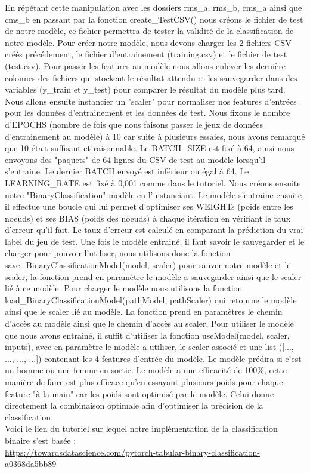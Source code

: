 \documentclass[a4paper,12pt]{report}	%
\begin{document}
En répétant cette manipulation avec les dossiers rms\_a, rms\_b, cms\_a ainsi que cms\_b en passant par la fonction create\_TestCSV() nous créons le fichier de test de notre modèle, ce fichier permettra de tester la validité de la classification de notre modèle. Pour créer notre modèle, nous devons charger les 2 fichiers CSV créés précédement, le fichier d'entrainement (training.csv) et le fichier de test (test.csv). Pour passer les features au modèle nous allons enlever les dernière colonnes des fichiers qui stockent le résultat attendu et les sauvegarder dans des variables (y\_train et y\_test) pour comparer le résultat du modèle plus tard.
Nous allons ensuite instancier un "scaler" pour normaliser nos features d'entrées pour les données d'entrainement et les données de test. Nous fixons le nombre d'EPOCHS (nombre de fois que nous faisons passer le jeux de données d'entrainement au modèle) à 10 car suite à plusieurs essaies, nous avons remarqué que 10 était suffisant et raisonnable. Le BATCH\_SIZE est fixé à 64, ainsi nous envoyons des "paquets" de 64 lignes du CSV de test au modèle lorsqu'il s'entraine. Le dernier BATCH envoyé est inférieur ou égal à 64.
Le LEARNING\_RATE est fixé à 0,001 comme dans le tutoriel. Nous créons ensuite notre "BinaryClassification" modèle en l'instanciant. Le modèle s'entraine ensuite, il effectue une boucle qui lui permet d'optimiser ses WEIGHTs (poids entre les noeuds) et ses BIAS (poids des noeuds) à chaque itération en vérifiant le taux d'erreur qu'il fait. Le taux d'erreur est calculé en comparant la prédiction du vrai label du jeu de test. Une fois le modèle entrainé, il faut savoir le sauvegarder et le charger pour pouvoir l'utiliser, nous utilisons donc la fonction save\_BinaryClassificationModel(model, scaler) pour sauver notre modèle et le scaler, la fonction prend en paramètre le modèle a sauvegarder ainsi que le scaler lié à ce modèle. Pour charger le modèle nous utilisons la fonction load\_BinaryClassificationModel(pathModel, pathScaler) qui retourne le modèle ainsi que le scaler lié au modèle. La fonction prend en paramètres le chemin d'accès au modèle ainsi que le chemin d'accès au scaler.
Pour utiliser le modèle que nous avons entrainé, il suffit d'utiliser la fonction useModel(model, scaler, inputs), avec en paramètre le modèle a utiliser, le scaler associé et une list ([..., ..., ..., ...]) contenant les 4 features d'entrée du modèle. Le modèle prédira si c'est un homme ou une femme en sortie. Le modèle a une efficacité de 100\%, cette manière de faire est plus efficace qu'en essayant plusieurs poids pour chaque feature "à la main" car les poids sont optimisé par le modèle. Celui donne directement la combinaison optimale afin d'optimiser la précision de la classification.\\
Voici le lien du tutoriel sur lequel notre implémentation de la classification binaire s'est basée : \\
\noindent
\url{https://towardsdatascience.com/pytorch-tabular-binary-classification-a0368da5bb89}
\end{document}
